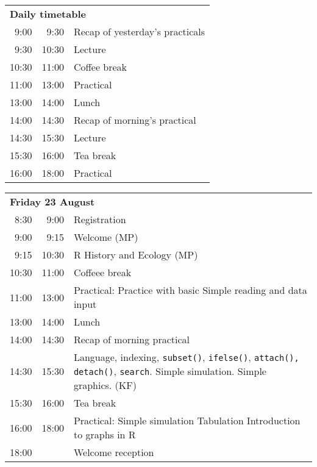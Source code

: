 \noindent
\begin{tabular}{r@{ -- }rp{13cm}}
\multicolumn{3}{l}{\bf Daily timetable} \\
 9:00 &  9:30 & Recap of yesterday's practicals \\
 9:30 & 10:30 & Lecture \\
10:30 & 11:00 & Coffee break \\
11:00 & 13:00 & Practical \\
13:00 & 14:00 & Lunch \\
14:00 & 14:30 & Recap of morning's practical \\
14:30 & 15:30 & Lecture \\
15:30 & 16:00 & Tea break \\
16:00 & 18:00 & Practical \\[2em]
\end{tabular}

\noindent
\begin{tabular}{r@{ -- }rp{13cm}}
\multicolumn{3}{l}{\bf Friday 23 August} \\
 8:30 &  9:00 & Registration \\
 9:00 &  9:15 & Welcome (MP) \\
 9:15 & 10:30 & R History and Ecology (MP) \\
10:30 & 11:00 & Coffeee break \\
11:00 & 13:00 & Practical:
                Practice with basic \R \newline
                Simple reading and data input \\
13:00 & 14:00 & Lunch \\
14:00 & 14:30 & Recap of morning practical \\
14:30 & 15:30 & Language, indexing,
                {\tt subset()}, {\tt ifelse()},
                \texttt{attach(), detach()},
                \texttt{search}. Simple simulation. Simple graphics. (KF)\\
15:30 & 16:00 & Tea break\\
16:00 & 18:00 & Practical: Simple simulation \newline
                Tabulation\newline
                Introduction to graphs in R \\
18:00 &       & Welcome reception \\[1em]
\end{tabular}

